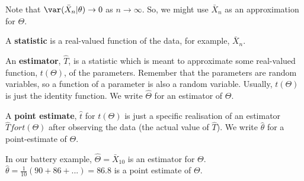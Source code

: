 \documentclass[a4paper]{article}
\begin{document}
            Note that $\var(\bar X_n | \theta) \to 0$ as $n \to \infty$. So, we
            might use $\bar X_n$ as an approximation for $\Theta$.

            \begin{definition}
                A \textbf{statistic} is a real-valued function of the data, for
                example, $\bar X_n$.

                An \textbf{estimator}, $\hat T$, is a statistic which is meant
                to approximate some real-valued function, $t(\Theta)$, of the
                parameters. Remember that the parameters are random variables,
                so a function of a parameter is also a random variable. Usually,
                $t(\Theta)$ is just the identity function. We write $\hat
                \Theta$ for an estimator of $\Theta$.

                A \textbf{point estimate}, $\hat t$ for $t(\Theta)$ is just a
                specific realisation of an estimator $\hat T for t(\Theta)$
                after observing the data (the actual value of $\hat T$). We
                write $\hat \theta$ for a point-estimate of $\Theta$.
            \end{definition}

            In our battery example, $\hat \Theta = \bar X_{10}$ is an estimator
            for $\Theta$. $\hat \theta = \frac{1}{10} (90 + 86 + ...) = 86.8$ is
            a point estimate of $\Theta$.
\end{document}
